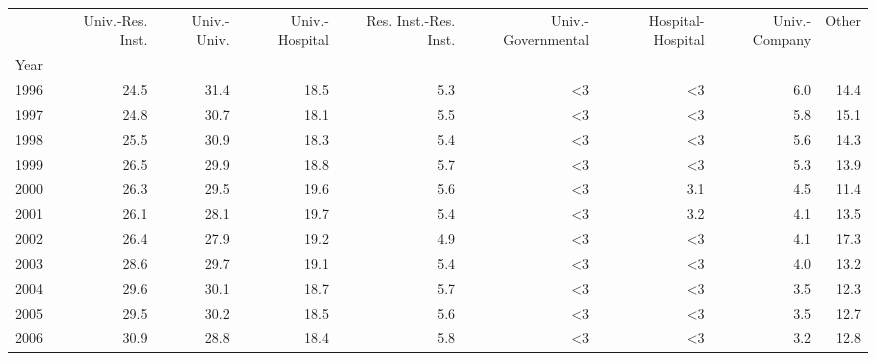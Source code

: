 \begin{tabular}{lrrrrrrrr}
\toprule
{} &  Univ.-Res. Inst. &  Univ.-Univ. &  Univ.-Hospital &  Res. Inst.-Res. Inst. &  Univ.-Governmental &  Hospital-Hospital &  Univ.-Company &  Other \\
Year &                   &              &                 &                        &                     &                    &                &        \\
\midrule
1996 &              24.5 &         31.4 &            18.5 &                    5.3 &                  <3 &                 <3 &            6.0 &   14.4 \\
1997 &              24.8 &         30.7 &            18.1 &                    5.5 &                  <3 &                 <3 &            5.8 &   15.1 \\
1998 &              25.5 &         30.9 &            18.3 &                    5.4 &                  <3 &                 <3 &            5.6 &   14.3 \\
1999 &              26.5 &         29.9 &            18.8 &                    5.7 &                  <3 &                 <3 &            5.3 &   13.9 \\
2000 &              26.3 &         29.5 &            19.6 &                    5.6 &                  <3 &                3.1 &            4.5 &   11.4 \\
2001 &              26.1 &         28.1 &            19.7 &                    5.4 &                  <3 &                3.2 &            4.1 &   13.5 \\
2002 &              26.4 &         27.9 &            19.2 &                    4.9 &                  <3 &                 <3 &            4.1 &   17.3 \\
2003 &              28.6 &         29.7 &            19.1 &                    5.4 &                  <3 &                 <3 &            4.0 &   13.2 \\
2004 &              29.6 &         30.1 &            18.7 &                    5.7 &                  <3 &                 <3 &            3.5 &   12.3 \\
2005 &              29.5 &         30.2 &            18.5 &                    5.6 &                  <3 &                 <3 &            3.5 &   12.7 \\
2006 &              30.9 &         28.8 &            18.4 &                    5.8 &                  <3 &                 <3 &            3.2 &   12.8 \\

\end{tabular}
